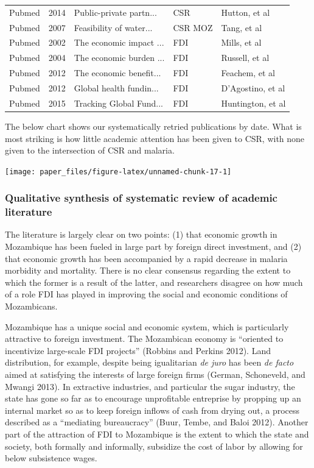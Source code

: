 \documentclass[]{elsarticle} %
\begin{document}
\begin{longtable}{lllll}
  Pubmed & 2014 & Public-private partn... & CSR & Hutton, et al \\ 
  Pubmed & 2007 & Feasibility of water... & CSR MOZ & Tang, et al \\ 
  Pubmed & 2002 & The economic impact ... & FDI & Mills, et al \\ 
  Pubmed & 2004 & The economic burden ... & FDI & Russell, et al \\ 
  Pubmed & 2012 & The economic benefit... & FDI & Feachem, et al \\ 
  Pubmed & 2012 & Global health fundin... & FDI & D'Agostino, et al \\ 
  Pubmed & 2015 & Tracking Global Fund... & FDI & Huntington, et al \\ 
   \hline
\hline
\end{longtable}

\endgroup

The below chart shows our systematically retried publications by date.
What is most striking is how little academic attention has been given to
CSR, with none given to the intersection of CSR and malaria.

\begin{center}\texttt{[image: paper\_files/figure-latex/unnamed-chunk-17-1]} \end{center}

\subsubsection{Qualitative synthesis of systematic review of academic
literature}\label{qualitative-synthesis-of-systematic-review-of-academic-literature}

The literature is largely clear on two points: (1) that economic growth
in Mozambique has been fueled in large part by foreign direct
investment, and (2) that economic growth has been accompanied by a rapid
decrease in malaria morbidity and mortality. There is no clear consensus
regarding the extent to which the former is a result of the latter, and
researchers disagree on how much of a role FDI has played in improving
the social and economic conditions of Mozambicans.

Mozambique has a unique social and economic system, which is
particularly attractive to foreign investment. The Mozambican economy is
``oriented to incentivize large-scale FDI projects'' (Robbins and
Perkins 2012). Land distribution, for example, despite being
igualitarian \emph{de juro} has been \emph{de facto} aimed at satisfying
the interests of large foreign firms (German, Schoneveld, and Mwangi
2013). In extractive industries, and particular the sugar industry, the
state has gone so far as to encourage unprofitable entreprise by
propping up an internal market so as to keep foreign inflows of cash
from drying out, a process described as a ``mediating bureaucracy''
(Buur, Tembe, and Baloi 2012). Another part of the attraction of FDI to
Mozambique is the extent to which the state and society, both formally
and informally, subsidize the cost of labor by allowing for below
subsistence wages.
\end{document}

